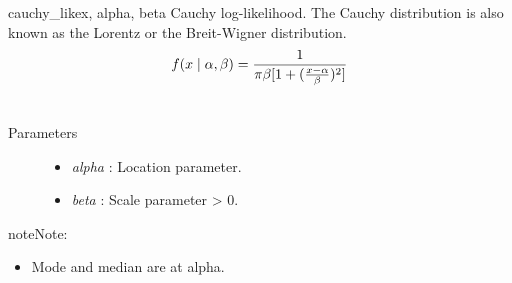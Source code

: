 \hypertarget{pymc.distributions.cauchy_like}{}\begin{funcdesc}{cauchy\_like}{x, alpha, beta}
Cauchy log-likelihood. The Cauchy distribution is also known as the
Lorentz or the Breit-Wigner distribution.
\begin{gather}
\begin{split}f(x \mid \alpha, \beta) = \frac{1}{\pi \beta [1 + (\frac{x-\alpha}{\beta})^2]}\end{split}\notag\\\begin{split}\end{split}\notag
\end{gather}\begin{description}
\item[Parameters] \leavevmode\begin{itemize}
\item {}
\emph{alpha} : Location parameter.

\item {}
\emph{beta} : Scale parameter \textgreater{} 0.

\end{itemize}

\end{description}

\begin{notice}{note}{Note:}\begin{itemize}
\item {}
Mode and median are at alpha.

\end{itemize}
\end{notice}
\end{funcdesc}

